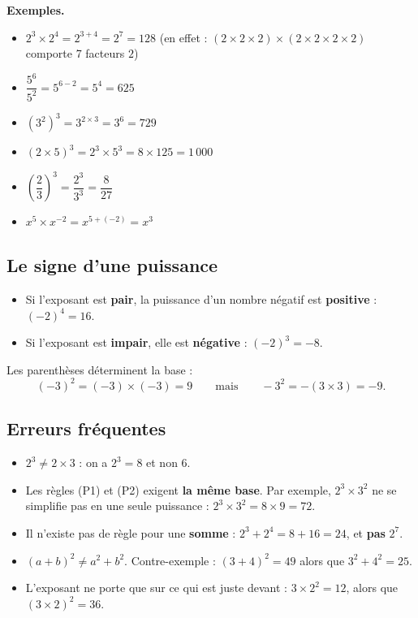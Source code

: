 \documentclass[../main.tex]{subfiles}
\begin{document}
\textbf{Exemples.}
\begin{itemize}
  \item $2^3 \times 2^4 = 2^{3+4} = 2^7 = 128$
        \quad (en effet : $(2\times2\times2)\times(2\times2\times2\times2)$ comporte 7 facteurs $2$)
  \item $\dfrac{5^6}{5^2} = 5^{6-2} = 5^4 = 625$
  \item $(3^2)^3 = 3^{2\times3} = 3^6 = 729$
  \item $(2\times5)^3 = 2^3 \times 5^3 = 8 \times 125 = 1\,000$
  \item $\left(\dfrac{2}{3}\right)^3 = \dfrac{2^3}{3^3} = \dfrac{8}{27}$
  \item $x^5 \times x^{-2} = x^{5+(-2)} = x^3$
\end{itemize}

\subsection{Le signe d'une puissance}

\begin{propriete}[Signe]
\begin{itemize}
  \item Si l'exposant est \textbf{pair}, la puissance d'un nombre négatif est \textbf{positive} : $(-2)^4 = 16$.
  \item Si l'exposant est \textbf{impair}, elle est \textbf{négative} : $(-2)^3 = -8$.
\end{itemize}
\end{propriete}

\begin{attention}
Les parenthèses déterminent la base :
\[
(-3)^2 = (-3)\times(-3) = 9 \qquad\text{mais}\qquad -3^2 = -(3\times 3) = -9.
\]
\end{attention}

\subsection{Erreurs fréquentes}

\begin{attention}
\begin{itemize}
  \item $2^3 \neq 2 \times 3$ : on a $2^3 = 8$ et non $6$.
  \item Les règles (P1) et (P2) exigent \textbf{la même base}. Par exemple, $2^3 \times 3^2$ ne se simplifie pas en une seule puissance : $2^3\times 3^2 = 8 \times 9 = 72$.
  \item Il n'existe pas de règle pour une \textbf{somme} : $2^3 + 2^4 = 8 + 16 = 24$, et \textbf{pas} $2^7$.
  \item $(a+b)^2 \neq a^2 + b^2$. Contre-exemple : $(3+4)^2 = 49$ alors que $3^2 + 4^2 = 25$.
  \item L'exposant ne porte que sur ce qui est juste devant : $3 \times 2^2 = 12$, alors que $(3\times2)^2 = 36$.
\end{itemize}
\end{attention}
\end{document}
